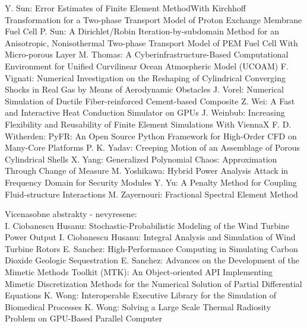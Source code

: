\documentclass[10pt, A4]{article}%
\begin{document}
{Y. Sun}: {Error Estimates of Finite Element MethodWith Kirchhoff Transformation for a Two-phase Transport Model of Proton Exchange Membrane Fuel Cell}
{P. Sun}: {A Dirichlet/Robin Iteration-by-subdomain Method for an Anisotropic, Nonisothermal Two-phase Transport Model of PEM Fuel Cell With Micro-porous Layer}
{M. Thomas}: {A Cyberinfrastructure-Based Computational Environment for Unified Curvilinear Ocean Atmospheric Model  (UCOAM)}
{F. Vignati}: {Numerical Investigation on the Reshaping of Cylindrical Converging Shocks in Real Gas by Means of Aerodynamic Obstacles}
{J. Vorel}: {Numerical Simulation of Ductile Fiber-reinforced Cement-based Composite}
{Z. Wei}: {A Fast and Interactive Heat Conduction Simulator on GPUs}
{J. Weinbub}: {Increasing Flexibility and Reusability of Finite Element Simulations With ViennaX}
{F. D. Witherden}: {PyFR: An Open Source Python Framework for High-Order CFD on Many-Core Platforms}
{P. K. Yadav}: {Creeping Motion of an Assemblage of Porous Cylindrical Shells}
{X. Yang}: {Generalized Polynomial Chaos: Approximation Through Change of Measure}
{M. Yoshikawa}: {Hybrid Power Analysis Attack in Frequency Domain for Security Modules}
{Y. Yu}: {A Penalty Method for Coupling Fluid-structure Interactions}
{M. Zayernouri}: {Fractional Spectral Element Method}


Vicenasobne abstrakty - nevyresene:\\
{I. Ciobanescu Husanu}: {Stochastic-Probabilistic Modeling of the Wind Turbine Power Output}
{I. Ciobanescu Husanu}: {Integral Analysis and Simulation of Wind Turbine Rotors}
{E. Sanchez}: {High-Performance Computing in Simulating Carbon Dioxide Geologic Sequestration}
{E. Sanchez}: {Advances on the Development of the Mimetic Methods Toolkit (MTK): An Object-oriented API Implementing Mimetic Discretization Methods for the Numerical Solution of Partial Differential Equations}
{K. Wong}: {Interoperable Executive Library for the Simulation of Biomedical Processes}
{K. Wong}: {Solving a Large Scale Thermal Radiosity Problem on GPU-Based Parallel Computer}
\end{document}
